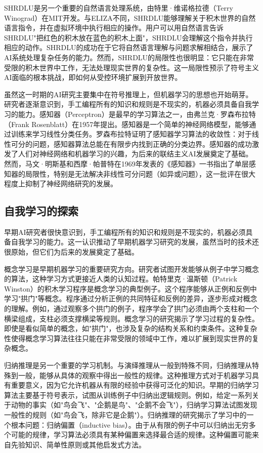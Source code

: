 SHRDLU是另一个重要的自然语言处理系统，由特里·维诺格拉德（Terry Winograd）在MIT开发。与ELIZA不同，SHRDLU能够理解关于积木世界的自然语言指令，并在虚拟环境中执行相应的操作。用户可以用自然语言告诉SHRDLU"把红色的积木放在蓝色的积木上面"，SHRDLU会理解这个指令并执行相应的动作。SHRDLU的成功在于它将自然语言理解与问题求解相结合，展示了AI系统处理复杂任务的能力。然而，SHRDLU的局限性也很明显：它只能在非常受限的积木世界中工作，无法处理现实世界的复杂性。这一局限性预示了符号主义AI面临的根本挑战，即如何从受控环境扩展到开放世界。

虽然这一时期的AI研究主要集中在符号推理上，但机器学习的思想也开始萌芽。研究者逐渐意识到，手工编程所有的知识和规则是不现实的，机器必须具备自我学习的能力。感知器（Perceptron）是最早的学习算法之一，由弗兰克·罗森布拉特（Frank Rosenblatt）在1957年提出。感知器是一个简单的神经网络模型，能够通过训练来学习线性分类任务。罗森布拉特证明了感知器学习算法的收敛性：对于线性可分的问题，感知器算法总能在有限步内找到正确的分类边界。感知器的成功激发了人们对神经网络和机器学习的兴趣，为后来的联结主义AI发展奠定了基础。然而，马文·明斯基和西摩·帕普特在1969年发表的《感知器》一书指出了单层感知器的局限性，特别是无法解决非线性可分问题（如异或问题），这一批评在很大程度上抑制了神经网络研究的发展。\

\subsection{自我学习的探索}

早期AI研究者很快意识到，手工编程所有的知识和规则是不现实的，机器必须具备自我学习的能力。这一认识推动了早期机器学习研究的发展，虽然当时的技术还很原始，但它们为后来的发展奠定了基础。

概念学习是早期机器学习的重要研究方向。研究者试图开发能够从例子中学习概念的算法，这种学习方式更接近人类的认知过程。帕特里克·温斯顿（Patrick Winston）的积木学习程序是概念学习的典型例子。这个程序能够从正例和反例中学习"拱门"等概念。程序通过分析正例的共同特征和反例的差异，逐步形成对概念的理解。例如，通过观察多个拱门的例子，程序学会了拱门必须由两个支柱和一个横梁组成，支柱必须支撑横梁等规则。概念学习的研究揭示了学习过程的复杂性。即使是看似简单的概念，如"拱门"，也涉及复杂的结构关系和约束条件。这种复杂性使得概念学习算法往往只能在非常受限的领域中工作，难以扩展到现实世界的复杂概念。

归纳推理是另一个重要的学习机制。与演绎推理从一般到特殊不同，归纳推理从特殊到一般，能够从具体的观察中得出一般性的规律。这种推理方式对于机器学习具有重要意义，因为它允许机器从有限的经验中获得可泛化的知识。早期的归纳学习算法主要基于符号表示，试图从训练例子中归纳出逻辑规则。例如，给定一系列关于动物的事实（如"鸟会飞"、"企鹅是鸟"、"企鹅不会飞"），归纳学习算法试图发现一般性的规则（如"鸟会飞，除非它是企鹅"）。归纳推理的研究揭示了学习中的一个根本问题：归纳偏置（inductive bias）。由于从有限的例子中可以归纳出无穷多个可能的规律，学习算法必须具有某种偏置来选择最合适的规律。这种偏置可能来自先验知识、简单性原则或其他启发式方法。

